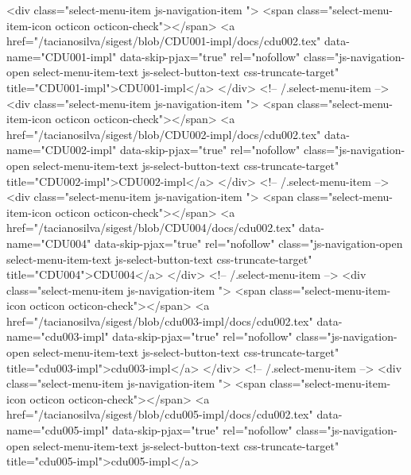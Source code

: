             <div class="select-menu-item js-navigation-item ">
              <span class="select-menu-item-icon octicon octicon-check"></span>
              <a href="/tacianosilva/sigest/blob/CDU001-impl/docs/cdu002.tex"
                 data-name="CDU001-impl"
                 data-skip-pjax="true"
                 rel="nofollow"
                 class="js-navigation-open select-menu-item-text js-select-button-text css-truncate-target"
                 title="CDU001-impl">CDU001-impl</a>
            </div> <!-- /.select-menu-item -->
            <div class="select-menu-item js-navigation-item ">
              <span class="select-menu-item-icon octicon octicon-check"></span>
              <a href="/tacianosilva/sigest/blob/CDU002-impl/docs/cdu002.tex"
                 data-name="CDU002-impl"
                 data-skip-pjax="true"
                 rel="nofollow"
                 class="js-navigation-open select-menu-item-text js-select-button-text css-truncate-target"
                 title="CDU002-impl">CDU002-impl</a>
            </div> <!-- /.select-menu-item -->
            <div class="select-menu-item js-navigation-item ">
              <span class="select-menu-item-icon octicon octicon-check"></span>
              <a href="/tacianosilva/sigest/blob/CDU004/docs/cdu002.tex"
                 data-name="CDU004"
                 data-skip-pjax="true"
                 rel="nofollow"
                 class="js-navigation-open select-menu-item-text js-select-button-text css-truncate-target"
                 title="CDU004">CDU004</a>
            </div> <!-- /.select-menu-item -->
            <div class="select-menu-item js-navigation-item ">
              <span class="select-menu-item-icon octicon octicon-check"></span>
              <a href="/tacianosilva/sigest/blob/cdu003-impl/docs/cdu002.tex"
                 data-name="cdu003-impl"
                 data-skip-pjax="true"
                 rel="nofollow"
                 class="js-navigation-open select-menu-item-text js-select-button-text css-truncate-target"
                 title="cdu003-impl">cdu003-impl</a>
            </div> <!-- /.select-menu-item -->
            <div class="select-menu-item js-navigation-item ">
              <span class="select-menu-item-icon octicon octicon-check"></span>
              <a href="/tacianosilva/sigest/blob/cdu005-impl/docs/cdu002.tex"
                 data-name="cdu005-impl"
                 data-skip-pjax="true"
                 rel="nofollow"
                 class="js-navigation-open select-menu-item-text js-select-button-text css-truncate-target"
                 title="cdu005-impl">cdu005-impl</a>
